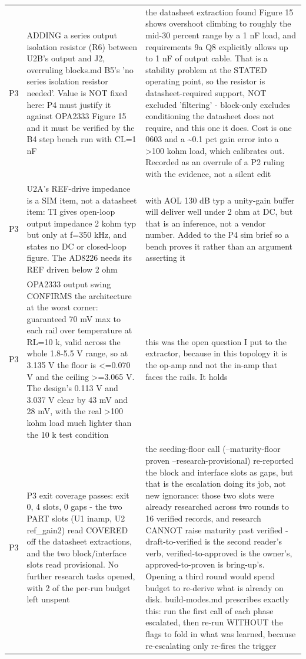 \documentclass[11pt,a4paper]{article}
\begin{document}
{\begin{longtable}{lp{5.2cm}p{7.2cm}}
P3 & ADDING a series output isolation resistor (R6) between U2B's output and J2, overruling blocks.md B5's 'no series isolation resistor needed'. Value is NOT fixed here: P4 must justify it against OPA2333 Figure 15 and it must be verified by the B4 step bench run with CL=1 nF & the datasheet extraction found Figure 15 shows overshoot climbing to roughly the mid-30 percent range by a 1 nF load, and requirements 9a Q8 explicitly allows up to 1 nF of output cable. That is a stability problem at the STATED operating point, so the resistor is datasheet-required support, NOT excluded 'filtering' - block-only excludes conditioning the datasheet does not require, and this one it does. Cost is one 0603 and a \textasciitilde{}0.1 pct gain error into a \textgreater{}100 kohm load, which calibrates out. Recorded as an overrule of a P2 ruling with the evidence, not a silent edit \\
P3 & U2A's REF-drive impedance is a SIM item, not a datasheet item: TI gives open-loop output impedance 2 kohm typ but only at f=350 kHz, and states no DC or closed-loop figure. The AD8226 needs its REF driven below 2 ohm & with AOL 130 dB typ a unity-gain buffer will deliver well under 2 ohm at DC, but that is an inference, not a vendor number. Added to the P4 sim brief so a bench proves it rather than an argument asserting it \\
P3 & OPA2333 output swing CONFIRMS the architecture at the worst corner: guaranteed 70 mV max to each rail over temperature at RL=10 k, valid across the whole 1.8-5.5 V range, so at 3.135 V the floor is \textless{}=0.070 V and the ceiling \textgreater{}=3.065 V. The design's 0.113 V and 3.037 V clear by 43 mV and 28 mV, with the real \textgreater{}100 kohm load much lighter than the 10 k test condition & this was the open question I put to the extractor, because in this topology it is the op-amp and not the in-amp that faces the rails. It holds \\
P3 & P3 exit coverage passes: exit 0, 4 slots, 0 gaps - the two PART slots (U1 inamp, U2 ref\_gain2) read COVERED off the datasheet extractions, and the two block/interface slots read provisional. No further research tasks opened, with 2 of the per-run budget left unspent & the seeding-floor call (--maturity-floor proven --research-provisional) re-reported the block and interface slots as gaps, but that is the escalation doing its job, not new ignorance: those two slots were already researched across two rounds to 16 verified records, and research CANNOT raise maturity past verified - draft-to-verified is the second reader's verb, verified-to-approved is the owner's, approved-to-proven is bring-up's. Opening a third round would spend budget to re-derive what is already on disk. build-modes.md prescribes exactly this: run the first call of each phase escalated, then re-run WITHOUT the flags to fold in what was learned, because re-escalating only re-fires the trigger \\

\end{longtable}}
\end{document}
